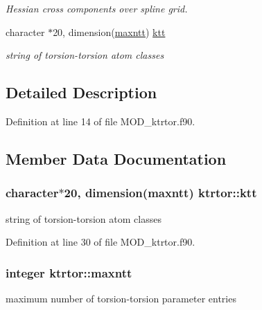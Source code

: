 \begin{DoxyCompactItemize}
\begin{DoxyCompactList}\small\item\em Hessian cross components over spline grid. \end{DoxyCompactList}\item 
character $\ast$20, dimension(\hyperlink{classktrtor_a3ec5934a4d1ffdfbc4f1bfbc33b1b836}{maxntt}) \hyperlink{classktrtor_a2ae91e0137595c4e306b09bbe8ed345f}{ktt}
\begin{DoxyCompactList}\small\item\em string of torsion-\/torsion atom classes \end{DoxyCompactList}\end{DoxyCompactItemize}


\subsection{Detailed Description}


Definition at line 14 of file M\-O\-D\-\_\-ktrtor.\-f90.



\subsection{Member Data Documentation}
\hypertarget{classktrtor_a2ae91e0137595c4e306b09bbe8ed345f}{
\subsubsection[{ktt}]{\setlength{\rightskip}{0pt plus 5cm}character$\ast$20, dimension({\bf maxntt}) ktrtor\-::ktt}}\label{classktrtor_a2ae91e0137595c4e306b09bbe8ed345f}


string of torsion-\/torsion atom classes 



Definition at line 30 of file M\-O\-D\-\_\-ktrtor.\-f90.

\hypertarget{classktrtor_a3ec5934a4d1ffdfbc4f1bfbc33b1b836}{
\subsubsection[{maxntt}]{\setlength{\rightskip}{0pt plus 5cm}integer ktrtor\-::maxntt}}\label{classktrtor_a3ec5934a4d1ffdfbc4f1bfbc33b1b836}


maximum number of torsion-\/torsion parameter entries 



